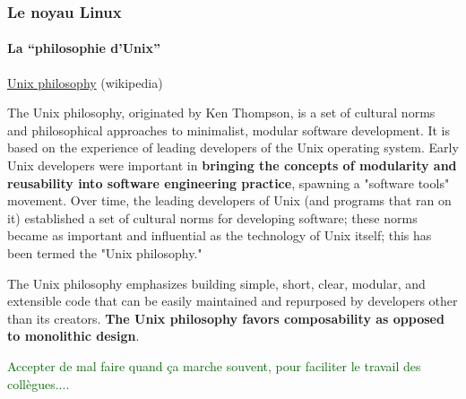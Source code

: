 \documentclass[xcolor=svgnames,final,smaller,a4]{beamer}
\begin{document}
\begin{frame}
  \frametitle{Le noyau Linux}
  \framesubtitle{La ``philosophie d'Unix''}

  \href{https://en.wikipedia.org/wiki/Unix_philosophy}{Unix philosophy} (wikipedia)

  \begin{relsize}{-0.6}
The Unix philosophy, originated by Ken Thompson, is a set of cultural
norms and philosophical approaches to minimalist, modular software
development. It is based on the experience of leading developers of
the Unix operating system. Early Unix developers were important in
\textbf{bringing the concepts of modularity and reusability into software
engineering practice}, spawning a "software tools" movement. Over time,
the leading developers of Unix (and programs that ran on it)
established a set of cultural norms for developing software; these
norms became as important and influential as the technology of Unix
itself; this has been termed the "Unix philosophy."

The Unix philosophy emphasizes building simple, short, clear, modular,
and extensible code that can be easily maintained and repurposed by
developers other than its creators. \textbf{The Unix philosophy favors
composability as opposed to monolithic design}.
  \end{relsize}

  \vspace{0.3cm}

  \begin{relsize}{-0.5}
   \textcolor{DarkGreen}{Accepter de mal faire quand ça marche souvent, pour faciliter le travail des collègues....}
  \end{relsize}
\end{frame}
\end{document}

